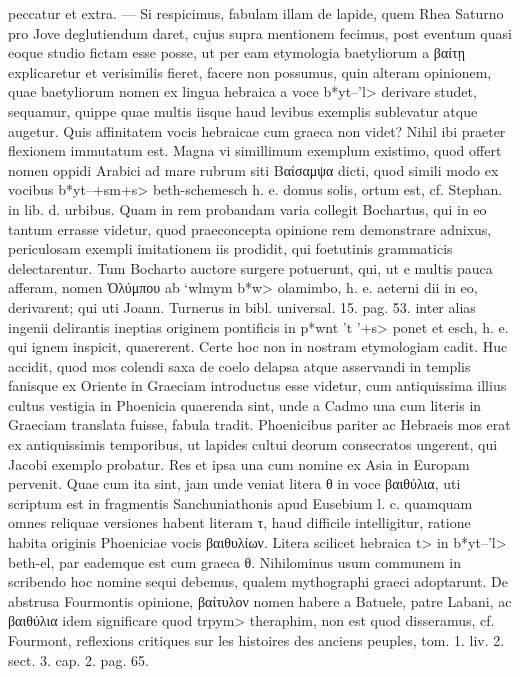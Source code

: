 \documentclass[a4paper, 11pt, oneside, polutonikogreek, german]{article}
\begin{document}
peccatur et extra. --- Si respicimus, fabulam illam de lapide, quem Rhea Saturno pro Jove deglutiendum daret, cujus supra mentionem fecimus, post eventum quasi eoque studio fictam esse posse, ut per eam etymologia baetyliorum a βαίτῃ explicaretur et verisimilis fieret, facere non possumus, quin alteram opinionem, quae baetyliorum nomen ex lingua hebraica a voce \<b*yt--'l> derivare studet, sequamur, quippe quae multis iisque haud levibus exemplis sublevatur atque augetur. Quis affinitatem vocis hebraicae cum graeca non videt? Nihil ibi praeter flexionem immutatum est. Magna vi simillimum exemplum existimo, quod offert nomen oppidi Arabici ad mare rubrum siti Βαίσαμψα dicti, quod simili modo ex vocibus \<b*yt--+sm+s> beth-schemesch h. e. domus solis, ortum est, cf. Stephan. in lib. d. urbibus. Quam in rem probandam varia collegit Bochartus, qui in eo tantum errasse videtur, quod praeconcepta opinione rem demonstrare adnixus, periculosam exempli imitationem iis prodidit, qui foetutinis grammaticis delectarentur. Tum Bocharto auctore surgere potuerunt, qui, ut e multis pauca afferam, nomen Ὀλύμπου ab \<`wlmym b*w> olamimbo, h. e. aeterni dii in eo, derivarent; qui uti Joann. Turnerus in bibl. universal. 15. pag. 53. inter alias ingenii delirantis ineptias originem pontificis in \<p*wnt 't '+s> ponet et esch, h. e. qui ignem inspicit, quaererent. Certe hoc non in nostram etymologiam cadit. Huc accidit, quod mos colendi saxa de coelo delapsa atque asservandi in templis fanisque ex Oriente in Graeciam introductus esse videtur, cum antiquissima illius cultus vestigia in Phoenicia quaerenda sint, unde a Cadmo una cum literis in Graeciam translata fuisse, fabula tradit. Phoenicibus pariter ac Hebraeis mos erat ex antiquissimis temporibus, ut lapides cultui deorum consecratos ungerent, qui Jacobi exemplo probatur. Res et ipsa una cum nomine ex Asia in Europam pervenit. Quae cum ita sint, jam unde veniat litera θ in voce βαιθύλια, uti scriptum est in fragmentis Sanchuniathonis apud Eusebium l. c. quamquam omnes reliquae versiones habent literam τ, haud difficile intelligitur, ratione habita originis Phoeniciae vocis βαιθυλίων. Litera scilicet hebraica \<t> in \<b*yt--'l> beth-el, par eademque est cum graeca θ. Nihilominus usum communem in scribendo hoc nomine sequi debemus, qualem mythographi graeci adoptarunt. De abstrusa Fourmontis opinione, βαίτυλον nomen habere a Batuele, patre Labani, ac βαιθύλια idem significare quod \<trpym> theraphim, non est quod disseramus, cf. Fourmont, reflexions critiques sur les histoires des anciens peuples, tom. 1. liv. 2. sect. 3. cap. 2. pag. 65.
\end{document}

